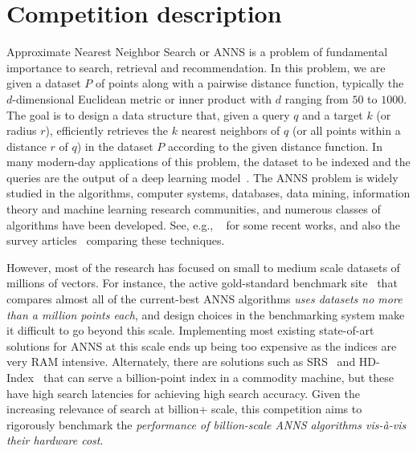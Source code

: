 
\section{Competition description}

Approximate Nearest Neighbor Search or ANNS is a problem of
fundamental importance to search, retrieval and recommendation.  In
this problem, we are given a dataset $P$ of points along with a
pairwise distance function, typically the $d$-dimensional Euclidean
metric or inner product with $d$ ranging from $50$ to $1000$. The
goal is to design a data structure that, given a query $q$ and a
target $k$ (or radius $r$), efficiently retrieves the $k$ nearest
neighbors of $q$ (or all points within a distance $r$ of $q$) in the
dataset $P$ according to the given distance function. In many
modern-day applications of this problem, the dataset to be indexed and
the queries are the output of a deep learning
model~\citep{deep1b-link,BERT}.  The ANNS problem is widely studied in
the algorithms, computer systems, databases, data mining, information
theory and machine learning research communities, and numerous classes
of algorithms have been developed. See, e.g.,
~\citep{CoverTree,babenko2014additive,Faiss17,Weber98,ECCV18,HNSW16,PQ11,Arya93,Indyk98,onng,scann,puffinn}
for some recent works, and also the survey
articles~\citep{samet2006foundations, LSHSurvey08, LearningToHash18,
  GraphANNSSurvey21} comparing these techniques.

However, most of the research has focused on small to medium scale
datasets of millions of vectors. For instance, the active
gold-standard benchmark site~\citep{Benchmark} that compares almost
all of the current-best ANNS algorithms \emph{uses datasets no more
  than a million points each}, and design choices in the benchmarking
system make it difficult to go beyond this scale.  Implementing most
existing state-of-art solutions for ANNS at this scale ends up being
too expensive as the indices are very RAM intensive. Alternately,
there are solutions such as SRS~\cite{Sun14} and
HD-Index~\cite{Arora18} that can serve a billion-point index in a
commodity machine, but these have high search latencies for achieving
high search accuracy.  Given the increasing relevance of search at
billion+ scale, this competition aims to rigorously benchmark the
\emph{performance of billion-scale ANNS algorithms vis-\`a-vis their
  hardware cost}.






